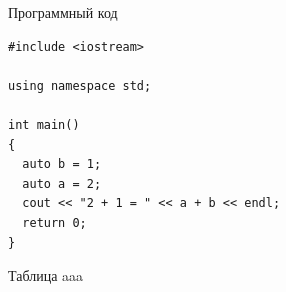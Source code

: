 \documentclass[rusmathsym, eqnumwithinsec, amspack, hyperref]{bomgost}
\begin{document}
\appendix

\begin{gostappendix}{Программный код}
\lstset{language=[11]c++,basicstyle=\ttfamily, showstringspaces=false}

\begin{lstlisting}
#include <iostream>

using namespace std;

int main()
{
  auto b = 1;
  auto a = 2;
  cout << "2 + 1 = " << a + b << endl;
  return 0;
}
\end{lstlisting}
\end{gostappendix}


\begin{gostappendix}{Таблица}
aaa
\end{gostappendix}
\end{document}
